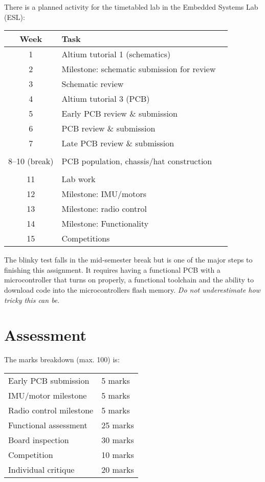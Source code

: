 \documentclass[11pt, a4paper]{article}
\begin{document}
There is a planned activity for the timetabled lab in the Embedded
Systems Lab (ESL):
%
\begin{flushleft}
  \begin{tabular}{ c l l }
    Week            &       Task \\
    \hline \hline
    
    1 & Altium tutorial 1 (schematics)  \\
    2 & Milestone: schematic submission for review  \\
    3 & Schematic review     \\
    4 & Altium tutorial 3 (PCB)         \\
    5 & Early PCB review \& submission                  \\
    6 & PCB review \& submission                  \\
    7 & Late PCB review \& submission                  \\
    \\
    8--10 (break) & PCB population, chassis/hat construction \\
    \\
    11 & Lab work \\
    12 & Milestone: IMU/motors          \\
    13 & Milestone: radio control       \\
    14 & Milestone: Functionality       \\
    15 & Competitions                   \\
  \end{tabular}
\end{flushleft}

The blinky test falls in the mid-semester break but is one of the major steps to
finishing this assignment. It requires having a functional PCB with a
microcontroller that turns on properly, a functional toolchain and the ability
to download code into the microcontrollers flash memory. \emph{Do not
underestimate how tricky this can be}.

\section{Assessment}

The marks breakdown (max. 100) is:
%
\begin{flushleft}
  \begin{tabular}{ll}
    Early PCB submission & 5 marks\\
    IMU/motor milestone  & 5 marks\\
    Radio control milestone  & 5 marks\\
    Functional assessment & 25 marks \\
    Board inspection & 30 marks \\
    Competition & 10 marks \\
    Individual critique & 20 marks \\
  \end{tabular}
  
\end{flushleft}
\end{document}

